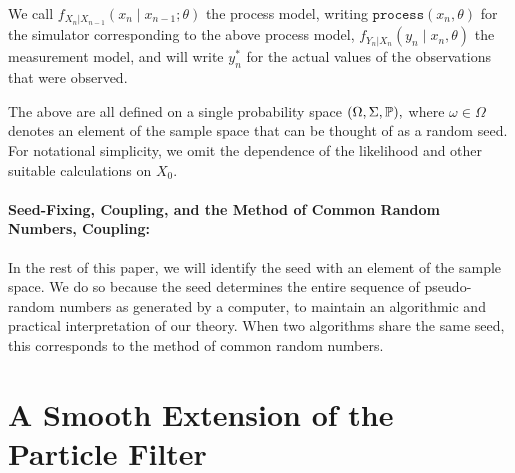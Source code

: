 \documentclass{article}
\begin{document}
We call $f_{X_n|X_{n-1}}\left(x_{n} \mid x_{n-1}; \theta\right)$ the process model, writing $\texttt{process}\left(x_n, \theta\right)$ for the simulator corresponding to the above process model, $f_{Y_n|X_n}\left(y_n \mid x_n, \theta\right)$ the measurement model, and will write $y_n^*$ for the actual values of the observations that were observed.

The above are all defined on a single probability space $(\Omega, \Sigma, \mathbb{P}),$ where $\omega \in \Omega$ denotes an element of the sample space that can be thought of as a random seed. For notational simplicity, we omit the dependence of the likelihood and other suitable calculations on $X_0.$

\paragraph{Seed-Fixing, Coupling, and the Method of Common Random Numbers, Coupling:}

In the rest of this paper, we will identify the seed with an element of the sample space. We do so because the seed determines the entire sequence of pseudo-random numbers as generated by a computer, to maintain an algorithmic and practical interpretation of our theory. When two algorithms share the same seed, this corresponds to the method of common random numbers. 


\section{A Smooth Extension of the Particle Filter}



\end{document}
